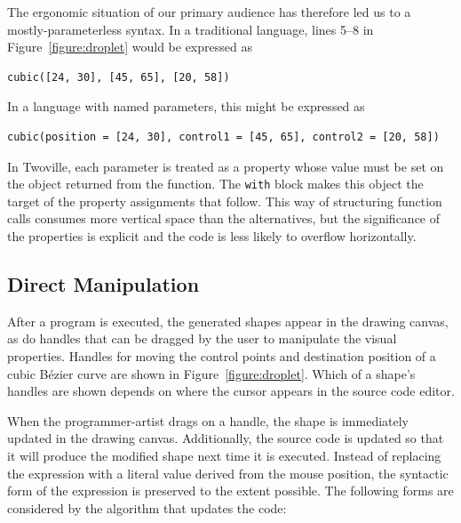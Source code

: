 The ergonomic situation of our primary audience has therefore led us to a mostly-parameterless syntax. In a traditional language, lines 5--8 in Figure~\ref{figure:droplet} would be expressed as
\begin{verbatim}
cubic([24, 30], [45, 65], [20, 58])
\end{verbatim}
In a language with named parameters, this might be expressed as
\begin{verbatim}
cubic(position = [24, 30], control1 = [45, 65], control2 = [20, 58])
\end{verbatim}
In Twoville, each parameter is treated as a property whose value must be set on the object returned from the function. The \verb=with= block makes this object the target of the property assignments that follow. This way of structuring function calls consumes more vertical space than the alternatives, but the significance of the properties is explicit and the code is less likely to overflow horizontally.

\subsection{Direct Manipulation}

After a program is executed, the generated shapes appear in the drawing canvas, as do handles that can be dragged by the user to manipulate the visual properties. Handles for moving the control points and destination position of a cubic B\'{e}zier curve are shown in Figure~\ref{figure:droplet}. Which of a shape's handles are shown depends on where the cursor appears in the source code editor.

When the programmer-artist drags on a handle, the shape is immediately updated in the drawing canvas. Additionally, the source code is updated so that it will produce the modified shape next time it is executed. Instead of replacing the expression with a literal value derived from the mouse position, the syntactic form of the expression is preserved to the extent possible. The following forms are considered by the algorithm that updates the code:

